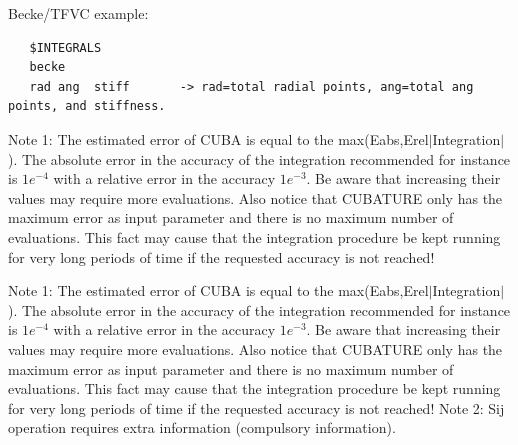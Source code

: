\documentclass[10pt,a4paper]{article}
\begin{document}
\noindent Becke/TFVC example:\newline
\begin{verbatim}
   $INTEGRALS
   becke
   rad ang  stiff       -> rad=total radial points, ang=total ang points, and stiffness.     
\end{verbatim}

\noindent Note 1: The estimated error of CUBA is equal to the max(Eabs,Erel$|$Integration$|$). The absolute error in the accuracy of the integration recommended for instance is $1e^{-4}$ with a relative error in the accuracy $1e^{-3}$. Be aware that increasing their values may require more evaluations. Also notice that CUBATURE only has the maximum error as input parameter and there is no maximum number of evaluations. This fact may cause that the integration procedure be kept running for very long periods of time if the requested accuracy is not reached!\newline

\noindent Note 1: The estimated error of CUBA is equal to the max(Eabs,Erel$|$Integration$|$). The absolute error in the accuracy of the integration recommended for instance is $1e^{-4}$ with a relative error in the accuracy $1e^{-3}$. Be aware that increasing their values may require more evaluations. Also notice that CUBATURE only has the maximum error as input parameter and there is no maximum number of evaluations. This fact may cause that the integration procedure be kept running for very long periods of time if the requested accuracy is not reached!\newline
\newline
\noindent Note 2: Sij operation requires extra information (compulsory information).  \newline   
\end{document}
